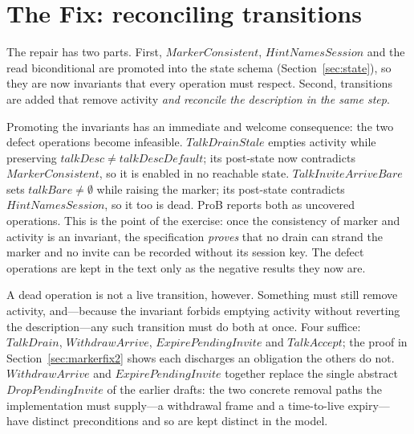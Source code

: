 \documentclass[a4paper,10pt,fleqn]{article}
\begin{document}
\section{The Fix: reconciling transitions}
\label{sec:markerfix}

The repair has two parts.  First, $MarkerConsistent$, $HintNamesSession$
and the read biconditional are promoted into the state schema
(Section~\ref{sec:state}), so they are now invariants that every
operation must respect.  Second, transitions are added that remove
activity \emph{and reconcile the description in the same step}.

Promoting the invariants has an immediate and welcome consequence: the
two defect operations become infeasible.  $TalkDrainStale$ empties
activity while preserving $talkDesc \neq talkDescDefault$; its post-state
now contradicts $MarkerConsistent$, so it is enabled in no reachable
state.  $TalkInviteArriveBare$ sets $talkBare \neq \emptyset$ while
raising the marker; its post-state contradicts $HintNamesSession$, so it
too is dead.  ProB reports both as uncovered operations.  This is the
point of the exercise: once the consistency of marker and activity is an
invariant, the specification \emph{proves} that no drain can strand the
marker and no invite can be recorded without its session key.  The defect
operations are kept in the text only as the negative results they now
are.

A dead operation is not a live transition, however.  Something must
still remove activity, and---because the invariant forbids emptying
activity without reverting the description---any such transition must do
both at once.  Four suffice: $TalkDrain$, $WithdrawArrive$,
$ExpirePendingInvite$ and $TalkAccept$; the proof in
Section~\ref{sec:markerfix2} shows each discharges an obligation the
others do not.  $WithdrawArrive$ and $ExpirePendingInvite$ together
replace the single abstract $DropPendingInvite$ of the earlier drafts:
the two concrete removal paths the implementation must supply---a
withdrawal frame and a time-to-live expiry---have distinct preconditions
and so are kept distinct in the model.
\end{document}
